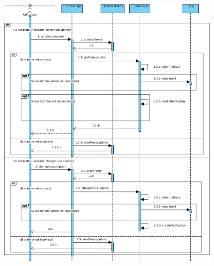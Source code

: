 \begin{figure}[h]
\centering
\includegraphics[width=1.3\textwidth]{extension-adrien/Sequence/img/gerer.png}
\end{figure}
